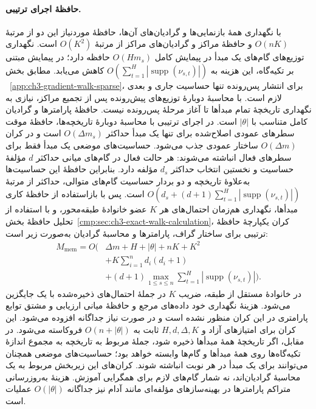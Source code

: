 \paragraph{حافظهٔ اجرای ترتیبی.}
با نگهداری همهٔ بازنمایی‌ها و گرادیان‌های آن‌ها،
حافظهٔ موردنیاز این دو از مرتبهٔ $O(nK)$ و
حافظهٔ مراکز و گرادیان‌های مراکز از مرتبهٔ
$O(K^2)$ است. نگهداری توزیع‌های گام‌های یک
مبدأ در پیمایش کامل $O(Hm_s)$ حافظه دارد؛
در پیمایش مبتنی بر تکیه‌گاه، این هزینه به
$O(\sum_{t=1}^{H}|\operatorname{supp}(\nu_{s,t})|)$
کاهش می‌یابد. مطابق بخش
~\ref{app:ch3-gradient-walk-sparse}،
برای انتشار پس‌رونده تنها حساسیت جاری و بعدی
لازم است. با محاسبهٔ دوبارهٔ توزیع‌های پیش‌رونده
پس از تجمیع مراکز، نیازی به نگهداری تاریخچهٔ
تمام مبدأها تا آغاز مرحلهٔ پس‌رونده نیست.
حافظهٔ پارامترها و گرادیان کامل متناسب با $|\theta|$
است. در اجرای ترتیبی با محاسبهٔ دوبارهٔ
تاریخچه‌ها، حافظهٔ موقت سطرهای عمودی اصلاح‌شده
برای تنها یک مبدأ حداکثر $O(\Delta m_s)$ است
و در کران $O(\Delta m)$ ساختار عمودی جذب می‌شود.
حساسیت‌های موضعی یک مبدأ فقط برای سطرهای فعال
انباشته می‌شوند: هر حالت فعال در گام‌های میانی
حداکثر $d$ مؤلفهٔ حساسیت و نخستین انتخاب
حداکثر $d_s$ مؤلفه دارد. بنابراین حافظهٔ این
حساسیت‌ها به‌علاوهٔ تاریخچه و دو بردار حساسیت
گام‌های متوالی، حداکثر از مرتبهٔ
$O(d_s+(d+1)\sum_{t=1}^{H}|\operatorname{supp}(\nu_{s,t})|)$
است. پس با بازاستفاده از حافظهٔ کاری مبدأها،
نگهداری هم‌زمان احتمال‌های هر $K$ عضو خانوادهٔ
طبقه‌محور، و با استفاده از تحلیل حافظهٔ
بخش~\ref{cmp:sec:ch3-exact-walk-calculation}،
کران یکپارچهٔ حافظهٔ ترتیبی برای ساختار گراف،
پارامترها و محاسبهٔ گرادیان به‌صورت زیر است:
\begin{equation}\label{cmp:eq:ch3-gradient-sequential-memory}
\boxed{\begin{aligned}
M_{\mathrm{mem}}=O\Bigg(&\Delta m+H+|\theta|+nK+K^2\\
&+K\sum_{i=1}^{n}d_i(d_i+1)\\
&+(d+1)\max_{1\le s\le n}
\sum_{t=1}^{H}|\operatorname{supp}(\nu_{s,t})|\Bigg).
\end{aligned}}
\end{equation}
در خانوادهٔ مستقل از طبقه، ضریب $K$ در
جملهٔ احتمال‌های ذخیره‌شده با یک جایگزین
می‌شود. هزینهٔ نگهداری خود داده‌های مرجع
و حافظهٔ میانی ارزیابی و مشتق توابع پارامتری
در این کران منظور نشده است و در صورت نیاز
جداگانه افزوده می‌شود. این کران برای امتیازهای
آزاد و $H,d,\Delta,K$ ثابت به
$O(n+|\theta|)$ فروکاسته می‌شود. در مقابل،
اگر تاریخچهٔ همهٔ مبدأها ذخیره شود، جملهٔ
مربوط به تاریخچه به مجموع اندازهٔ
تکیه‌گاه‌ها روی همهٔ مبدأها و گام‌ها وابسته
خواهد بود؛ حساسیت‌های موضعی همچنان می‌توانند
برای یک مبدأ در هر نوبت انباشته شوند.
کران‌های این زیربخش مربوط به یک محاسبهٔ
گرادیان‌اند، نه شمار گام‌های لازم برای
همگرایی آموزش. هزینهٔ
به‌روزرسانی متراکم پارامترها در بهینه‌سازهای
مؤلفه‌ای مانند آدام \cite{KingmaBa2015Adam} نیز جداگانه $O(|\theta|)$ عملیات است.

